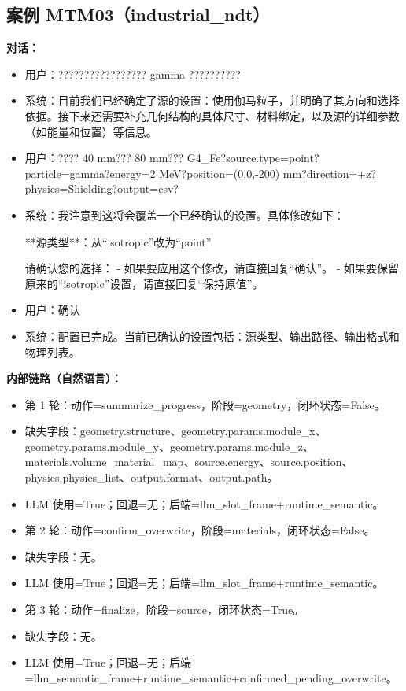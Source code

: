 \documentclass[11pt]{ctexart}
\begin{document}
\subsection{案例 MTM03（industrial\_ndt）}
\textbf{对话：}
\begin{itemize}
\item 用户：????????????????? gamma ??????????
\item 系统：目前我们已经确定了源的设置：使用伽马粒子，并明确了其方向和选择依据。接下来还需要补充几何结构的具体尺寸、材料绑定，以及源的详细参数（如能量和位置）等信息。
\item 用户：???? 40 mm??? 80 mm??? G4\_Fe?source.type=point?particle=gamma?energy=2 MeV?position=(0,0,-200) mm?direction=+z?physics=Shielding?output=csv?
\item 系统：我注意到这将会覆盖一个已经确认的设置。具体修改如下：

**源类型**：从“isotropic”改为“point”

请确认您的选择：
- 如果要应用这个修改，请直接回复“确认”。
- 如果要保留原来的“isotropic”设置，请直接回复“保持原值”。
\item 用户：确认
\item 系统：配置已完成。当前已确认的设置包括：源类型、输出路径、输出格式和物理列表。
\end{itemize}
\textbf{内部链路（自然语言）：}
\begin{itemize}
\item 第 1 轮：动作=summarize\_progress，阶段=geometry，闭环状态=False。
\item 缺失字段：geometry.structure、geometry.params.module\_x、geometry.params.module\_y、geometry.params.module\_z、materials.volume\_material\_map、source.energy、source.position、physics.physics\_list、output.format、output.path。
\item LLM 使用=True；回退=无；后端=llm\_slot\_frame+runtime\_semantic。
\item 第 2 轮：动作=confirm\_overwrite，阶段=materials，闭环状态=False。
\item 缺失字段：无。
\item LLM 使用=True；回退=无；后端=llm\_slot\_frame+runtime\_semantic。
\item 第 3 轮：动作=finalize，阶段=source，闭环状态=True。
\item 缺失字段：无。
\item LLM 使用=True；回退=无；后端=llm\_semantic\_frame+runtime\_semantic+confirmed\_pending\_overwrite。
\end{itemize}
\end{document}
